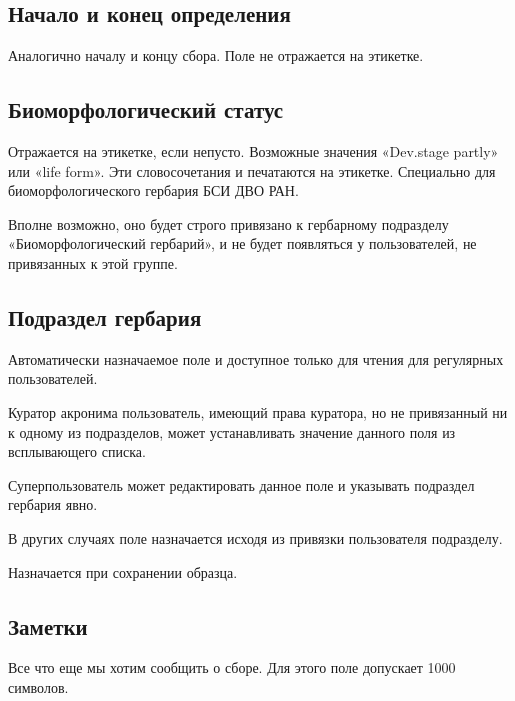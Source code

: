 \documentclass[letterpaper,10pt,russian]{sphinxmanual}
\begin{document}
\subsection{Начало и конец определения}
\label{\detokenize{main:id32}}\label{\detokenize{main:index-28}}
Аналогично началу и концу сбора. Поле не отражается на этикетке.

\ignorespaces 

\subsection{Биоморфологический статус}
\label{\detokenize{main:id33}}\label{\detokenize{main:index-29}}
Отражается на этикетке, если непусто. Возможные значения
«Dev.stage partly» или «life form». Эти словосочетания
и печатаются на этикетке. Специально для биоморфологического
гербария БСИ ДВО РАН.

Вполне возможно, оно будет строго привязано к гербарному
подразделу «Биоморфологический гербарий», и не будет появляться
у пользователей, не привязанных к этой группе.

\ignorespaces 

\subsection{Подраздел гербария}
\label{\detokenize{main:index-30}}\label{\detokenize{main:id34}}
Автоматически назначаемое поле и доступное только для чтения для регулярных пользователей.

Куратор акронима \textendash{} пользователь, имеющий права куратора, но не привязанный ни к одному
из подразделов, может устанавливать значение данного поля из всплывающего списка.

Суперпользователь может редактировать данное поле и указывать подраздел гербария явно.

В других случаях поле назначается исходя из привязки пользователя подразделу.

Назначается при сохранении образца.

\ignorespaces 

\subsection{Заметки}
\label{\detokenize{main:id35}}\label{\detokenize{main:index-31}}
Все что еще мы хотим сообщить о сборе. Для этого поле допускает 1000 символов.
\end{document}
